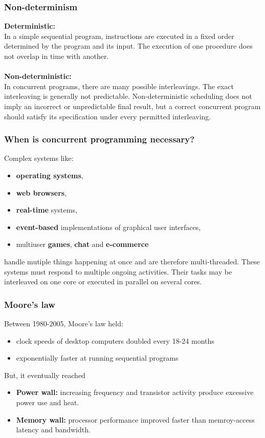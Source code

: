 \documentclass[11pt]{article}
\begin{document}
\subsubsection{Non-determinism}
\textbf{Deterministic:}\\
In a simple sequential program, instructions are executed in a fixed order determined by the program and its input. 
The execution of one procedure does not overlap in time with another.
\\\\
\textbf{Non-deterministic:}\\
In concurrent programs, there are many possible interleavings. The exact interleaving is generally not predictable. 
Non-deterministic scheduling does not imply an incorrect or unpredictable final result, but a correct concurrent program should satisfy its specification under every permitted interleaving.
\subsubsection{When is concurrent programming necessary?}
Complex systems like:
\begin{itemize}
    \item \textbf{operating systems},
    \item \textbf{web browsers},
    \item \textbf{real-time} systems,
    \item \textbf{event-based} implementations of graphical user interfaces,
    \item multiuser \textbf{games}, \textbf{chat} and \textbf{e-commerce}
\end{itemize}
handle mutiple things happening at once and are therefore multi-threaded. These systems must respond to multiple ongoing activities.
Their tasks may be interleaved on one core or executed in parallel on several cores.
\subsubsection{Moore's law}
Between 1980-2005, Moore's law held:
\begin{itemize}
    \item clock speeds of desktop computers doubled every 18-24 months
    \item exponentially faster at running sequential programs
\end{itemize}
But, it eventually reached
\begin{itemize}
    \item \textbf{Power wall:} increasing frequency and transistor activity produce excessive power use and heat.
    \item \textbf{Memory wall:} processor performance improved faster than memroy-access latency and bandwidth.
\end{itemize}
\end{document}
